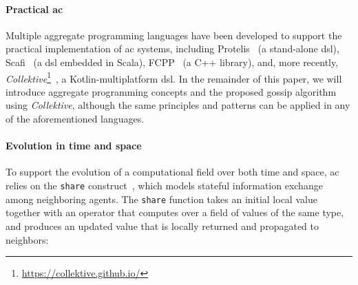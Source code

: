 \documentclass[runningheads]{llncs}
\newcommand{\ck}{\emph{Collektive}}
\begin{document}
%

\paragraph{Practical \acl{ac}}

Multiple aggregate programming languages have been developed to support the practical implementation of \ac{ac} systems,
including Protelis~\cite{PianiniSAC2015} (a stand-alone \ac{dsl}),
Scafi~\cite{scafi} (a \ac{dsl} embedded in Scala),
FCPP~\cite{DBLP:journals/scp/AudritoT24} (a C++ library),
and, more recently, \ck{}\footnote{\url{https://collektive.github.io/}}~\cite{DBLP:conf/acsos/Cortecchia24}, a Kotlin-multiplatform \ac{dsl}.
%
In the remainder of this paper,
we will introduce aggregate programming concepts and the proposed gossip algorithm using \ck{},
although the same principles and patterns can be applied in any of the aforementioned languages.

\paragraph{Evolution in time and space}
To support the evolution of a computational field over both time and space,
\ac{ac} relies on the \lstinline|share| construct~\cite{DBLP:conf/coordination/AudritoBDPV19},
which models stateful information exchange among neighboring agents.
%
The \lstinline|share| function takes an initial local value together with an operator
that computes over a field of values of the same type,
and produces an updated value that is locally returned and propagated to neighbors:
\end{document}
